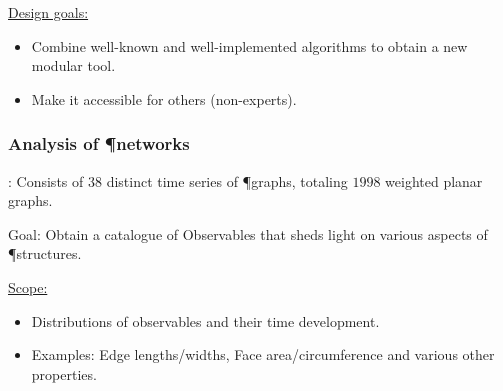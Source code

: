 \documentclass[	hyperref={pdfpagelabels=false}, xcolor=dvipsnames,
		11pt]{beamer}
\begin{document}
\begin{frame}
\begin{columns}
\begin{column}{6cm}
\begin{overprint}
	\end{overprint}
	\end{column}
	\end{columns}

		\begin{alertblock}{\underline{Design goals:}}
		\begin{itemize}
		  	\item Combine well-known and well-implemented algorithms to obtain a new modular tool.
		  	\item Make it accessible for others (\eg non-experts).
		\end{itemize}
		\end{alertblock}
\end{frame}

\begin{frame}
    \frametitle{Analysis of \P networks} 

	\begin{block}{\data:} 
		Consists of $38$ distinct time series of \P graphs, totaling $1998$ weighted planar graphs.
	\end{block}

	\begin{block}{Goal:} 
		Obtain a catalogue of Observables that sheds light on various aspects of \P structures.
	\end{block}

	\begin{alertblock}{\underline{Scope:}}
	 \begin{itemize}
	  \item Distributions of observables and their time development.
	  \item Examples: Edge lengths/widths, Face area/circumference and various other properties.
	 \end{itemize}
	\end{alertblock}
\end{frame}
\end{document}

